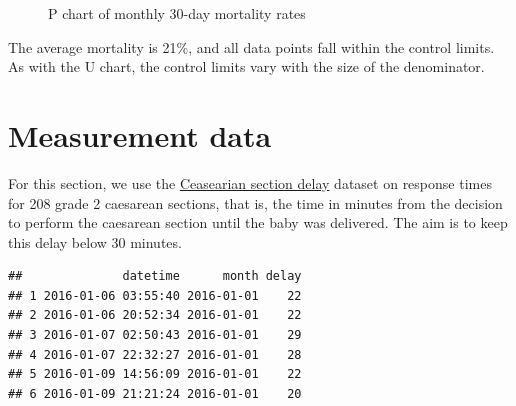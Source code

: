 \documentclass[
]{book}
\makeatletter
\newenvironment{Shaded}{\begin{snugshade}}{\end{snugshade}}
\newcommand{\AttributeTok}[1]{\textcolor[rgb]{0.13,0.29,0.53}{#1}}
\newcommand{\CommentTok}[1]{\textcolor[rgb]{0.56,0.35,0.01}{\textit{#1}}}
\newcommand{\FunctionTok}[1]{\textcolor[rgb]{0.13,0.29,0.53}{\textbf{#1}}}
\newcommand{\NormalTok}[1]{#1}
\newcommand{\OtherTok}[1]{\textcolor[rgb]{0.56,0.35,0.01}{#1}}
\newcommand{\SpecialCharTok}[1]{\textcolor[rgb]{0.81,0.36,0.00}{\textbf{#1}}}
\newcommand{\StringTok}[1]{\textcolor[rgb]{0.31,0.60,0.02}{#1}}
\newcommand*\pandocbounded[1]{%
  \sbox\pandoc@box{#1}%
  \Gscale@div\@tempa{\textheight}{\dimexpr\ht\pandoc@box+\dp\pandoc@box\relax}%
  \Gscale@div\@tempb{\linewidth}{\wd\pandoc@box}%
  \ifdim\@tempb\p@<\@tempa\p@\let\@tempa\@tempb\fi%
  \ifdim\@tempa\p@<\p@\scalebox{\@tempa}{\usebox\pandoc@box}%
  \else\usebox{\pandoc@box}%
  \fi%
}
\makeatother
\begin{document}
\begin{figure}
\centering
\pandocbounded{}
\caption{P chart of monthly 30-day mortality rates}
\end{figure}

The average mortality is 21\%, and all data points fall within the
control limits. As with the U chart, the control limits vary with the
size of the denominator.

\section{Measurement data}\label{measurement-data-1}

For this section, we use the
\hyperref[ceasearian-section-delay]{Ceasearian section delay} dataset on
response times for 208 grade 2 caesarean sections, that is, the time in
minutes from the decision to perform the caesarean section until the
baby was delivered. The aim is to keep this delay below 30 minutes.

\begin{Shaded}
\end{Shaded}

\begin{verbatim}
##              datetime      month delay
## 1 2016-01-06 03:55:40 2016-01-01    22
## 2 2016-01-06 20:52:34 2016-01-01    22
## 3 2016-01-07 02:50:43 2016-01-01    29
## 4 2016-01-07 22:32:27 2016-01-01    28
## 5 2016-01-09 14:56:09 2016-01-01    22
## 6 2016-01-09 21:21:24 2016-01-01    20
\end{verbatim}
\end{document}
